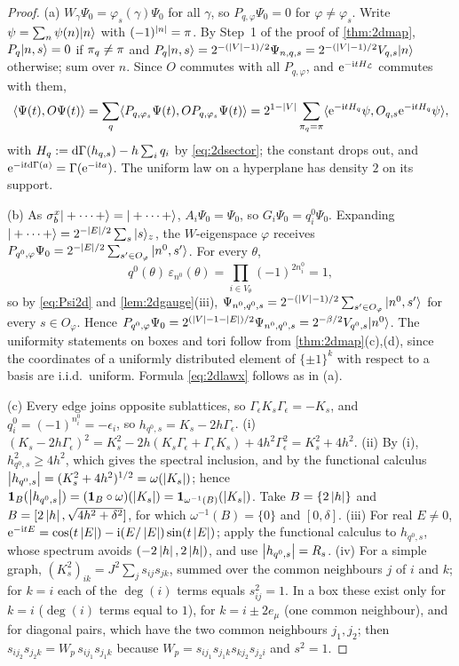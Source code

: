 \begin{proof}
(a) $W_\gamma\Psi_0=\varphi_s(\gamma)\Psi_0$ for all $\gamma$, so $P_{q,\varphi}\Psi_0=0$ for $\varphi\neq\varphi_s$.  Write
$\psi=\sum_n\psi(n)|n\rangle$ with $(-1)^{\left|n\right|}=\pi$.  By Step~1 of the proof of \cref{thm:2dmap},
$P_q|n,s\rangle=0$ if $\pi_q\neq\pi$ and $P_q|n,s\rangle=2^{-(\left|V\right|-1)/2}\Psi_{n,q,s}=2^{-(\left|V\right|-1)/2}V_{q,s}|n\rangle$
otherwise; sum over $n$.  Since $O$ commutes with all $P_{q,\varphi}$, and $\mathrm{e}^{-\mathrm{i} tH_{\mathcal{L}}}$ commutes with them,
\[
  \langle\Psi(t),O\Psi(t)\rangle=\sum_q\langle P_{q,\varphi_s}\Psi(t),OP_{q,\varphi_s}\Psi(t)\rangle
  =2^{1-\left|V\right|}\sum_{\pi_q=\pi}\langle\mathrm{e}^{-\mathrm{i} tH_q}\psi,O_{q,s}\mathrm{e}^{-\mathrm{i} tH_q}\psi\rangle,
\]
with $H_q:=\mathrm{d}\Gamma(h_{q,s})-h\sum_iq_i$ by \eqref{eq:2dsector}; the constant drops out, and
$\mathrm{e}^{-\mathrm{i} t\mathrm{d}\Gamma(a)}=\Gamma(\mathrm{e}^{-\mathrm{i} ta})$.  The uniform law on a hyperplane has density $2$ on its support.

(b) As $\sigma^x_b|+\cdots+\rangle=|+\cdots+\rangle$, $A_i\Psi_0=\Psi_0$, so $G_i\Psi_0=q^0_i\Psi_0$.  Expanding
$|+\cdots+\rangle=2^{-\left|E\right|/2}\sum_s|s\rangle_z$, the $W$-eigenspace $\varphi$ receives
$P_{q^0,\varphi}\Psi_0=2^{-\left|E\right|/2}\sum_{s'\in O_\varphi}|n^0,s'\rangle$.  For every $\theta$,
\[
  q^0(\theta)\,\varepsilon_{n^0}(\theta)=\prod_{i\in V_\theta}(-1)^{2n^0_i}=1,
\]
so by \eqref{eq:Psi2d} and \cref{lem:2dgauge}(iii),
$\Psi_{n^0,q^0,s}=2^{-(\left|V\right|-1)/2}\sum_{s'\in O_\varphi}|n^0,s'\rangle$ for every $s\in O_\varphi$.  Hence $P_{q^0,\varphi}\Psi_0=2^{(\left|V\right|-1-\left|E\right|)/2}\Psi_{n^0,q^0,s}=2^{-\beta/2}V_{q^0,s}|n^0\rangle$.
The uniformity statements on boxes and tori follow from \cref{thm:2dmap}(c),(d), since the coordinates of a
uniformly distributed element of $\{\pm1\}^k$ with respect to a basis are i.i.d.\ uniform.  Formula
\eqref{eq:2dlawx} follows as in (a).

(c) Every edge joins opposite sublattices, so $\Gamma_\epsilon K_s\Gamma_\epsilon=-K_s$, and
$q^0_i=(-1)^{n^0_i}=-\epsilon_i$, so $h_{q^0,s}=K_s-2h\Gamma_\epsilon$.  (i)
$(K_s-2h\Gamma_\epsilon)^2=K_s^2-2h(K_s\Gamma_\epsilon+\Gamma_\epsilon K_s)+4h^2\Gamma_\epsilon^2=K_s^2+4h^2$.  (ii) By
(i), $h_{q^0,s}^2\ge4h^2$, which gives the spectral inclusion, and by the functional calculus
$\left|h_{q^0,s}\right|=(K_s^2+4h^2)^{1/2}=\omega(\left|K_s\right|)$; hence $\mathbf{1}_B(\left|h_{q^0,s}\right|)=(\mathbf{1}_B\circ\omega)(\left|K_s\right|)
=\mathbf{1}_{\omega^{-1}(B)}(\left|K_s\right|)$.  Take $B=\{2\left|h\right|\}$ and $B=[2\left|h\right|,\sqrt{4h^2+\delta^2}]$, for which
$\omega^{-1}(B)=\{0\}$ and $[0,\delta]$.  (iii) For real $E\ne0$, $\mathrm{e}^{-\mathrm{i} tE}=\cos(t\left|E\right|)-\mathrm{i}(E/\left|E\right|)\sin(t\left|E\right|)$;
apply the functional calculus to $h_{q^0,s}$, whose spectrum avoids $(-2\left|h\right|,2\left|h\right|)$, and use
$\left|h_{q^0,s}\right|=R_s$.  (iv) For a simple graph, $(K_s^2)_{ik}=J^2\sum_js_{ij}s_{jk}$, summed over the common
neighbours $j$ of $i$ and $k$; for $k=i$ each of the $\deg(i)$ terms equals $s_{ij}^2=1$.  In a box these exist only for $k=i$ ($\deg(i)$ terms equal to $1$), for $k=i\pm2e_\mu$ (one common
neighbour), and for diagonal pairs, which have the two common neighbours $j_1,j_2$; then
$s_{ij_2}s_{j_2k}=W_p\,s_{ij_1}s_{j_1k}$ because $W_p=s_{ij_1}s_{j_1k}s_{kj_2}s_{j_2i}$ and $s^2=1$.
\end{proof}

